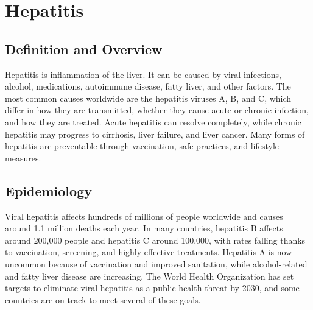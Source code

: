 \chapter{Hepatitis}

\section*{Definition and Overview}
Hepatitis is inflammation of the liver. It can be caused by viral infections, alcohol, medications, autoimmune disease, fatty liver, and other factors. The most common causes worldwide are the hepatitis viruses A, B, and C, which differ in how they are transmitted, whether they cause acute or chronic infection, and how they are treated. Acute hepatitis can resolve completely, while chronic hepatitis may progress to cirrhosis, liver failure, and liver cancer. Many forms of hepatitis are preventable through vaccination, safe practices, and lifestyle measures.

\section*{Epidemiology}
Viral hepatitis affects hundreds of millions of people worldwide and causes around 1.1 million deaths each year. In many countries, hepatitis B affects around 200,000 people and hepatitis C around 100,000, with rates falling thanks to vaccination, screening, and highly effective treatments. Hepatitis A is now uncommon because of vaccination and improved sanitation, while alcohol-related and fatty liver disease are increasing. The World Health Organization has set targets to eliminate viral hepatitis as a public health threat by 2030, and some countries are on track to meet several of these goals.

